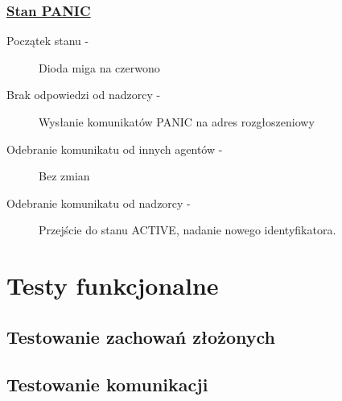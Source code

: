 \subsubsection{\underline{Stan PANIC}}

\begin{description}
    \item[Początek stanu -]Dioda miga na czerwono
    \item[Brak odpowiedzi od nadzorcy -]Wysłanie komunikatów PANIC na adres rozgłoszeniowy
    \item[Odebranie komunikatu od innych agentów -]Bez zmian
    \item[Odebranie komunikatu od nadzorcy -]Przejście do stanu ACTIVE, nadanie nowego identyfikatora.
\end{description}


\section{Testy funkcjonalne}


\subsection{Testowanie zachowań złożonych}

\subsection{Testowanie komunikacji}

